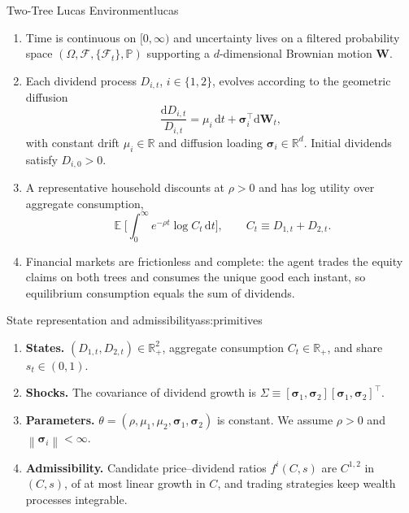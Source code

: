 ﻿\documentclass[11pt,letterpaper,oneside]{article}
\numberwithin{equation}{section}
\DeclareMathOperator{\E}{\mathbb{E}}
\newcommand{\R}{\mathbb{R}}
\newcommand{\1}{\mathbf{1}}
\newcommand{\diff}{\mathrm{d}}
\newcommand{\norm}[1]{\left\lVert #1\right\rVert}
\begin{document}
\begin{assumption}{Two-Tree Lucas Environment}{lucas}
\begin{enumerate}[leftmargin=1.25em]
  \item Time is continuous on $[0,\infty)$ and uncertainty lives on a filtered probability space $(\Omega,\mathcal F,\{\mathcal F_t\},\mathbb P)$ supporting a $d$-dimensional Brownian motion $\bm W$.
  \item Each dividend process $D_{i,t}$, $i\in\{1,2\}$, evolves according to the geometric diffusion
  \begin{equation}\label{eq:dividend}
    \frac{\diff D_{i,t}}{D_{i,t}} = \mu_i\,\diff t + \bm{\sigma}_i^{\top}\diff \bm W_t,
  \end{equation}
  with constant drift $\mu_i\in\R$ and diffusion loading $\bm\sigma_i\in\R^d$. Initial dividends satisfy $D_{i,0}>0$.
  \item A representative household discounts at $\rho>0$ and has log utility over aggregate consumption,
  \[
    \E\Big[\int_0^{\infty} e^{-\rho t}\log C_t\,\diff t\Big], \qquad C_t \equiv D_{1,t}+D_{2,t}.
  \]
  \item Financial markets are frictionless and complete: the agent trades the equity claims on both trees and consumes the unique good each instant, so equilibrium consumption equals the sum of dividends.
\end{enumerate}
\end{assumption}

\begin{assumption}{State representation and admissibility}{ass:primitives}
\begin{enumerate}[label=(\roman*),itemsep=0.25em]
  \item \textbf{States.} $(D_{1,t},D_{2,t})\in\R_+^2$, aggregate consumption $C_t\in\R_+$, and share $s_t\in(0,1)$.
  \item \textbf{Shocks.} The covariance of dividend growth is $\Sigma\equiv[\bm\sigma_1,\bm\sigma_2][\bm\sigma_1,\bm\sigma_2]^{\top}$.
  \item \textbf{Parameters.} $\theta=(\rho,\mu_1,\mu_2,\bm\sigma_1,\bm\sigma_2)$ is constant. We assume $\rho>0$ and $\norm{\bm\sigma_i}<\infty$.
  \item \textbf{Admissibility.} Candidate price--dividend ratios $f^i(C,s)$ are $C^{1,2}$ in $(C,s)$, of at most linear growth in $C$, and trading strategies keep wealth processes integrable.
\end{enumerate}
\end{assumption}
\end{document}
